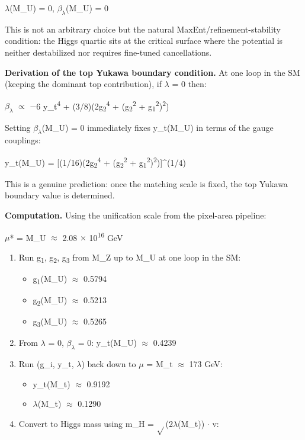 \documentclass[11pt,a4paper]{article}
\theoremstyle{remark}
\providecommand{\tightlist}{%
  \setlength{\itemsep}{0pt}\setlength{\parskip}{0pt}}
\begin{document}
\ensuremath{\lambda}(M\_U) = 0, \(\beta_{\lambda}\)(M\_U) = 0

This is not an arbitrary choice but the natural MaxEnt/refinement-stability condition: the Higgs quartic sits at the critical surface where the potential is neither destabilized nor requires fine-tuned cancellations.

\textbf{Derivation of the top Yukawa boundary condition.} At one loop in the SM (keeping the dominant top contribution), if \ensuremath{\lambda} = 0 then:

\(\beta_{\lambda}\) \ensuremath{\propto} \ensuremath{-}6 y\_t\textsuperscript{4} + (3/8)(2g\textsubscript{2}\textsuperscript{4} + (g\textsubscript{2}\textsuperscript{2} + g\textsubscript{1}\textsuperscript{2})\textsuperscript{2})

Setting \(\beta_{\lambda}\)(M\_U) = 0 immediately fixes y\_t(M\_U) in terms of the gauge couplings:

y\_t(M\_U) = {[}(1/16)(2g\textsubscript{2}\textsuperscript{4} + (g\textsubscript{2}\textsuperscript{2} + g\textsubscript{1}\textsuperscript{2})\textsuperscript{2}){]}\^{}(1/4)

This is a genuine prediction: once the matching scale is fixed, the top Yukawa boundary value is determined.

\textbf{Computation.} Using the unification scale from the pixel-area pipeline:

\ensuremath{\mu}* = M\_U \ensuremath{\approx} 2.08 \ensuremath{\times} 10\textsuperscript{16} GeV

\begin{enumerate}
\def\labelenumi{\arabic{enumi}.}
\item
  Run g\textsubscript{1}, g\textsubscript{2}, g\textsubscript{3} from M\_Z up to M\_U at one loop in the SM:

  \begin{itemize}
  \tightlist
  \item
    g\textsubscript{1}(M\_U) \ensuremath{\approx} 0.5794
  \item
    g\textsubscript{2}(M\_U) \ensuremath{\approx} 0.5213
  \item
    g\textsubscript{3}(M\_U) \ensuremath{\approx} 0.5265
  \end{itemize}
\item
  From \ensuremath{\lambda} = 0, \(\beta_{\lambda}\) = 0: y\_t(M\_U) \ensuremath{\approx} 0.4239
\item
  Run (g\_i, y\_t, \ensuremath{\lambda}) back down to \ensuremath{\mu} = M\_t \ensuremath{\approx} 173 GeV:

  \begin{itemize}
  \tightlist
  \item
    y\_t(M\_t) \ensuremath{\approx} 0.9192
  \item
    \ensuremath{\lambda}(M\_t) \ensuremath{\approx} 0.1290
  \end{itemize}
\item
  Convert to Higgs mass using m\_H = \ensuremath{\sqrt{}}(2\ensuremath{\lambda}(M\_t)) \ensuremath{\cdot} v:
\end{enumerate}
\end{document}
